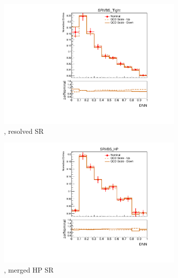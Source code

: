 \begin{figure}[ht]
\begin{subfigure}[b]{0.3\textwidth}
        \includegraphics[width=\textwidth]{figures/1lep/PDFUnc/QCDScale/Z_0ptag2pjet_0ptv_SRVBS_Tight_DNN_SysTheoryQCD_Z__1up_Norm.pdf}
        \caption{\Zjets, resolved SR}
    \end{subfigure}
    \begin{subfigure}[b]{0.3\textwidth}
        \includegraphics[width=\textwidth]{figures/1lep/PDFUnc/QCDScale/Z_0ptag1pfat0pjet_0ptv_SRVBS_HP_DNN_SysTheoryQCD_Z__1up_Norm.pdf}
        \caption{\Zjets, merged HP SR}
    \end{subfigure}
    \begin{subfigure}[b]{0.3\textwidth}

\end{subfigure}
\end{figure}

